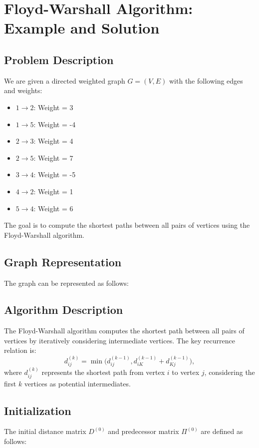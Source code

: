 \section{Floyd-Warshall Algorithm: Example and Solution}

\subsection{Problem Description}
We are given a directed weighted graph \( G = (V, E) \) with the following edges and weights:
\begin{itemize}
    \item \( 1 \to 2 \): Weight = 3
    \item \( 1 \to 5 \): Weight = -4
    \item \( 2 \to 3 \): Weight = 4
    \item \( 2 \to 5 \): Weight = 7
    \item \( 3 \to 4 \): Weight = -5
    \item \( 4 \to 2 \): Weight = 1
    \item \( 5 \to 4 \): Weight = 6
\end{itemize}
The goal is to compute the shortest paths between all pairs of vertices using the Floyd-Warshall algorithm.

\subsection{Graph Representation}
The graph can be represented as follows:

\subsection{Algorithm Description}
The Floyd-Warshall algorithm computes the shortest path between all pairs of vertices by iteratively considering intermediate vertices. The key recurrence relation is:
\[
d^{(k)}_{ij} = \min\big(d^{(k-1)}_{ij}, d^{(k-1)}_{iK} + d^{(k-1)}_{Kj}\big),
\]
where \( d^{(k)}_{ij} \) represents the shortest path from vertex \( i \) to vertex \( j \), considering the first \( k \) vertices as potential intermediates.

\subsection{Initialization}
The initial distance matrix \( D^{(0)} \) and predecessor matrix \( \Pi^{(0)} \) are defined as follows:


